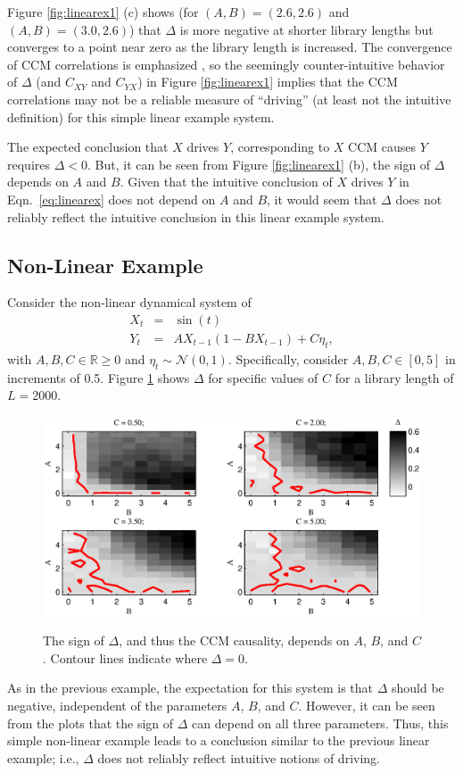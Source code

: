 \documentclass[twocolumn,aps,pre,groupedaddress]{revtex4-1}
\begin{document}
Figure \ref{fig:linearex1} (c) shows (for $(A,B) = (2.6,2.6)$ and $(A,B)=(3.0,2.6)$) that $\Delta$ is more negative at shorter library lengths but converges to a point near zero as the library length is increased.  The convergence of CCM correlations is emphasized \cite{Sugihara2012}, so the seemingly counter-intuitive behavior of $\Delta$ (and $C_{XY}$ and $C_{YX}$) in Figure \ref{fig:linearex1} implies that the CCM correlations may not be a reliable measure of ``driving'' (at least not the intuitive definition) for this simple linear example system.

The expected conclusion that $X$ drives $Y$, corresponding to $X$ CCM causes $Y$ requires $\Delta<0$.  But, it can be seen from Figure \ref{fig:linearex1} (b), the sign of $\Delta$ depends on $A$ and $B$.  Given that the intuitive conclusion of $X$ drives $Y$ in Eqn.\ \ref{eq:linearex} does not depend on $A$ and $B$, it would seem that $\Delta$ does not reliably reflect the intuitive conclusion in this linear example system.  

\subsection{Non-Linear Example}
Consider the non-linear dynamical system of
\begin{eqnarray}
\label{eqn:nonlinearEX}
X_t &=& \sin(t)\\
Y_t &=& AX_{t-1}\left(1-BX_{t-1}\right)+C\eta_t,
\end{eqnarray}
with $A,B,C\in\mathbb{R}\ge 0$ and $\eta_t\sim\mathcal{N}\left(0,1\right)$.  Specifically, consider $A,B,C\in[0,5]$ in increments of 0.5.  Figure \ref{fig:nonlinearex} shows $\Delta$ for specific values of $C$ for a library length of $L=2000$.
\begin{figure}[ht]
\includegraphics[scale=0.5]{NonLinearEx.eps} \\
\caption{The sign of $\Delta$, and thus the CCM causality, depends on $A$, $B$, and $C$. Contour lines indicate where $\Delta=0$.}
\label{fig:nonlinearex}
\end{figure}
As in the previous example, the expectation for this system is that $\Delta$ should be negative, independent of the parameters $A$, $B$, and $C$.  However, it can be seen from the plots that the sign of $\Delta$ can depend on all three parameters.  Thus, this simple non-linear example leads to a conclusion similar to the previous linear example; i.e., $\Delta$ does not reliably reflect intuitive notions of driving.
\end{document}
